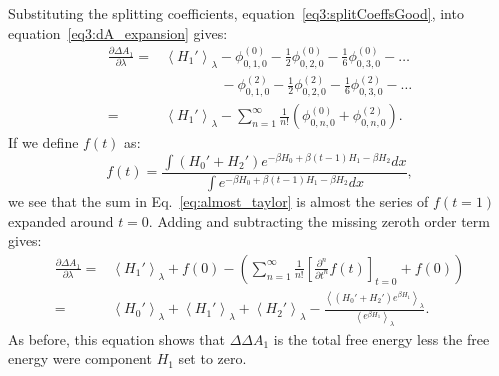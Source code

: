 \documentclass{article}
\begin{document}
\begin{appendices}
Substituting the splitting coefficients, equation~\ref{eq3:splitCoeffsGood}, into equation~\ref{eq3:dA_expansion} gives:
\begin{align}
\frac{\partial \Delta A_1}{\partial\lambda} =& 
	\left\langle
		 H_1'
	\right\rangle_\lambda -
	\phi_{0,1,0}^{(0)} -
	\frac{1}{2} \phi_{0,2,0}^{(0)} -
	\frac{1}{6} \phi_{0,3,0}^{(0)} - \ldots \nonumber\\
	& \qquad \qquad 
	 -
	\phi_{0,1,0}^{(2)} -
	\frac{1}{2} \phi_{0,2,0}^{(2)} -
	\frac{1}{6} \phi_{0,3,0}^{(2)} - \ldots \nonumber\\
	=&
	\left\langle
		H_1'
	\right\rangle_\lambda -
	\sum_{n=1}^{\infty} \frac{1}{n!} \left( \phi_{0,n,0}^{(0)} + \phi_{0,n,0}^{(2)} \right). 
\label{eq3:almost_taylor}
\end{align}
If we define $f(t)$ as:
\begin{equation}
f(t) = \frac
	{\int (H_0'+H_2') e^{-\beta H_0 + \beta(t-1) H_1 - \beta H_2} dx}
	{\int e^{-\beta H_0 + \beta(t-1) H_1 - \beta H_2} dx},
\end{equation}
we see that the sum in Eq.~\ref{eq:almost_taylor} is almost the series of $f(t=1)$ expanded around $t=0$. Adding and subtracting the missing zeroth order term gives:
\begin{align}
\frac{\partial \Delta A_1}{\partial \lambda} =&
	\left\langle
		H_1'
	\right\rangle_\lambda +
	f(0) -
	\left(
		\sum_{n=1}^{\infty} \frac{1}{n!}
		\left[ \frac{\partial^n}{\partial t^n} f(t) \right]_{t=0}
		+ f(0)
	\right)\nonumber\\
=&
	\left\langle
		H_0'
	\right\rangle_\lambda +
	\left\langle
		H_1'
	\right\rangle_\lambda +
	\left\langle
		H_2'
	\right\rangle_\lambda -
	\frac
		{\left\langle (H_0' + H_2' )e^{\beta H_1} \right\rangle_\lambda}
		{\left\langle e^{\beta H_1} \right\rangle_\lambda} . 
	\label{eq3:same_ensemble}
\end{align}
As before, this equation shows that $\Delta \Delta A_1$ is the total free energy less the free energy were component $H_1$ set to zero. 


\end{appendices}
\end{document}
